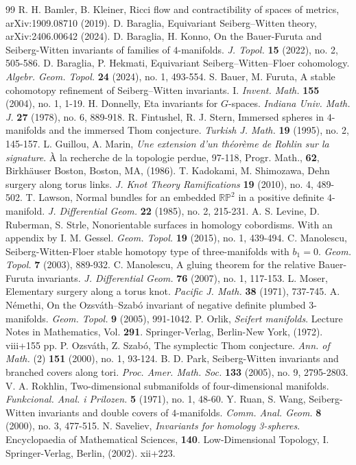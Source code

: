\documentclass{amsart}
\theoremstyle{definition}
\theoremstyle{remark}
\numberwithin{equation}{section}
\begin{document}
\begin{thebibliography}{99}
R. H. Bamler, B. Kleiner, Ricci flow and contractibility of spaces of metrics, arXiv:1909.08710 (2019).
D. Baraglia, Equivariant Seiberg--Witten theory, arXiv:2406.00642 (2024).
D. Baraglia, H. Konno, On the Bauer-Furuta and Seiberg-Witten invariants of families of $4$-manifolds. {\em J. Topol.} {\bf 15} (2022), no. 2, 505-586. 
D. Baraglia, P. Hekmati, Equivariant Seiberg--Witten--Floer cohomology. {\em Algebr. Geom. Topol.} {\bf 24} (2024), no. 1, 493-554.
S. Bauer, M. Furuta, A stable cohomotopy refinement of Seiberg--Witten invariants. I. {\em Invent. Math.} {\bf 155} (2004), no. 1, 1-19.
H. Donnelly, Eta invariants for $G$-spaces. {\em Indiana Univ. Math. J.} {\bf 27} (1978), no. 6, 889-918. 
R. Fintushel, R. J. Stern, Immersed spheres in $4$-manifolds and the immersed Thom conjecture. {\em Turkish J. Math.} {\bf 19} (1995), no. 2, 145-157.
L. Guillou, A. Marin, {\em Une extension d'un th\'eor\`eme de Rohlin sur la signature}. \`A la recherche de la topologie perdue, 97-118, Progr. Math., {\bf 62}, Birkh\"auser Boston, Boston, MA, (1986). 
T. Kadokami, M. Shimozawa, Dehn surgery along torus links. {\em J. Knot Theory Ramifications} {\bf 19} (2010), no. 4, 489-502. 
T. Lawson, Normal bundles for an embedded $\mathbb{RP}^2$ in a positive definite $4$-manifold. {\em J. Differential Geom.} {\bf 22} (1985), no. 2, 215-231. 
A. S. Levine, D. Ruberman, S. Strle, Nonorientable surfaces in homology cobordisms. With an appendix by I. M. Gessel. {\em Geom. Topol.} {\bf 19} (2015), no. 1, 439-494. 
C. Manolescu, Seiberg-Witten-Floer stable homotopy type of three-manifolds with $b_1=0$. {\em Geom. Topol.} {\bf 7} (2003), 889-932. 
C. Manolescu, A gluing theorem for the relative Bauer-Furuta invariants. {\em J. Differential Geom.} {\bf 76} (2007), no. 1, 117-153. 
L. Moser, Elementary surgery along a torus knot. {\em Pacific J. Math.} {\bf 38} (1971), 737-745. 
A. N\'emethi, On the Ozsv\'ath--Szab\'o invariant of negative definite plumbed 3-manifolds. {\em Geom. Topol.} {\bf 9} (2005), 991-1042.
P. Orlik, {\em Seifert manifolds}. Lecture Notes in Mathematics, Vol. {\bf 291}. Springer-Verlag, Berlin-New York, (1972). viii+155 pp. 
P. Ozsv\'ath, Z. Szab\'o, The symplectic Thom conjecture. {\em Ann. of Math.} (2) {\bf 151} (2000), no. 1, 93-124.
B. D. Park, Seiberg-Witten invariants and branched covers along tori. {\em Proc. Amer. Math. Soc.} {\bf 133} (2005), no. 9, 2795-2803. 
V. A. Rokhlin, Two-dimensional submanifolds of four-dimensional manifolds. {\em Funkcional. Anal. i Prilozen.} {\bf 5} (1971), no. 1, 48-60. 
Y. Ruan, S. Wang, Seiberg-Witten invariants and double covers of $4$-manifolds. {\em Comm. Anal. Geom.} {\bf 8} (2000), no. 3, 477-515. 
N. Saveliev, {\em Invariants for homology 3-spheres}. Encyclopaedia of Mathematical Sciences, {\bf 140}. Low-Dimensional Topology, I. Springer-Verlag, Berlin, (2002). xii+223.
\end{thebibliography}
\end{document}
